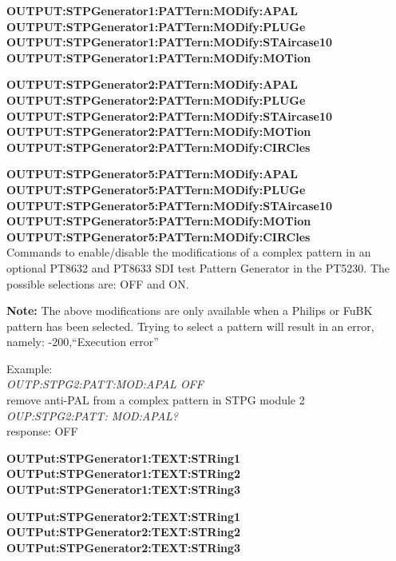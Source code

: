 \textbf{OUTPUT:STPGenerator1:PATTern:MODify:APAL}\\
\textbf{OUTPUT:STPGenerator1:PATTern:MODify:PLUGe}\\
\textbf{OUTPUT:STPGenerator1:PATTern:MODify:STAircase10}\\
\textbf{OUTPUT:STPGenerator1:PATTern:MODify:MOTion}

\textbf{OUTPUT:STPGenerator2:PATTern:MODify:APAL}\\
\textbf{OUTPUT:STPGenerator2:PATTern:MODify:PLUGe}\\
\textbf{OUTPUT:STPGenerator2:PATTern:MODify:STAircase10}\\
\textbf{OUTPUT:STPGenerator2:PATTern:MODify:MOTion}\\
\textbf{OUTPUT:STPGenerator2:PATTern:MODify:CIRCles}

\textbf{OUTPUT:STPGenerator5:PATTern:MODify:APAL}\\
\textbf{OUTPUT:STPGenerator5:PATTern:MODify:PLUGe}\\
\textbf{OUTPUT:STPGenerator5:PATTern:MODify:STAircase10}\\
\textbf{OUTPUT:STPGenerator5:PATTern:MODify:MOTion}\\
\textbf{OUTPUT:STPGenerator5:PATTern:MODify:CIRCles}\\
Commands to enable/disable the modifications of a complex pattern in an optional PT8632 and PT8633 SDI test Pattern Generator in the PT5230. The possible selections are: OFF and ON. 

\textbf{Note:} The above modifications are only available when a Philips or FuBK pattern has been selected. Trying to select a pattern will result in an error, namely: -200,``Execution error''

Example:\\
\textit{OUTP:STPG2:PATT:MOD:APAL OFF}\\
remove anti-PAL from a complex pattern in STPG module 2\\
\textit{OUP:STPG2:PATT: MOD:APAL?}\\
response: OFF

\textbf{OUTPut:STPGenerator1:TEXT:STRing1}\\
\textbf{OUTPut:STPGenerator1:TEXT:STRing2}\\
\textbf{OUTPut:STPGenerator1:TEXT:STRing3}

\textbf{OUTPut:STPGenerator2:TEXT:STRing1}\\
\textbf{OUTPut:STPGenerator2:TEXT:STRing2}\\
\textbf{OUTPut:STPGenerator2:TEXT:STRing3}

